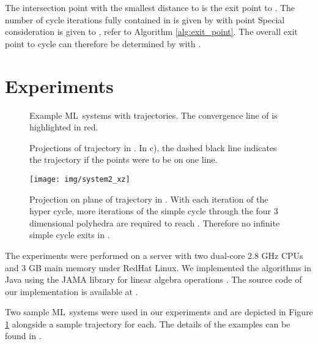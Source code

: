 \documentclass[copyright,creativecommons]{packages/eptcs}
\newcommand{\ml}{\mbox{ML}}
\begin{document}
The intersection point with the smallest distance  to  is the exit point to . The number of cycle iterations fully contained in  is given by  with point  Special consideration is given to , refer to Algorithm \ref{alg:exit_point}. The overall exit point to cycle  can therefore be determined by  with .





\section{Experiments}\label{sec:experiments}

\begin{figure}[tb]
  \centering
  \caption{Example \ml~systems with trajectories. The convergence line of  is highlighted in red.}
  \label{fig:example_systems}
\end{figure}

\begin{figure}[tb]
  \centering
  \caption{Projections of trajectory in . In c), the dashed black line indicates the trajectory if the points were to be on one line.}
  \label{fig:projections1}
\end{figure}

\begin{figure}[tb]
  \centering
  \texttt{[image: img/system2\_xz]}
  \caption{Projection on  plane of trajectory in . With each iteration of the hyper cycle, more iterations of the simple cycle through the four 3 dimensional polyhedra are required to reach . Therefore no infinite simple cycle exits in .}
  \label{fig:projections2}
\end{figure}



The  experiments were performed on a server with two dual-core 2.8 GHz CPUs and 3 GB main memory under RedHat Linux. We implemented the algorithms in Java using the JAMA library for linear algebra operations \cite{HetAl00}. 
The source code of our implementation is available at \cite{TF11}.



Two sample \ml~systems were used in our experiments and are depicted in Figure \ref{fig:example_systems} alongside a sample trajectory for each.  The  details of the examples can be found in \cite{TF11-2}.
\end{document}
